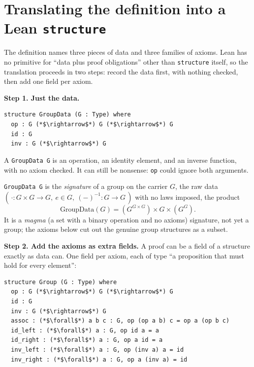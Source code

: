 \section{\texorpdfstring{Translating the definition into a Lean \texttt{structure}}{Translating the definition into a Lean structure}}\label{sec:07-groups:02-translating:1}

The definition names three pieces of data and three families of axioms. Lean has no primitive for ``data plus proof obligations'' other than \texttt{structure} itself, so the translation proceeds in two steps: record the data first, with nothing checked, then add one field per axiom.

\textbf{Step 1. Just the data.}

\begin{lstlisting}
structure GroupData (G : Type) where
  op : G (*$\rightarrow$*) G (*$\rightarrow$*) G
  id : G
  inv : G (*$\rightarrow$*) G
\end{lstlisting}

A \texttt{GroupData G} is an operation, an identity element, and an inverse function, with no axiom checked. It can still be nonsense: \texttt{op} could ignore both arguments.

\begin{mathreading}

\texttt{GroupData G} is the \emph{signature} of a group on the carrier \(G\), the raw data \((\,\cdot : G\times G \to G,\ e \in G,\
(-)^{-1} : G \to G\,)\) with no laws imposed, the product \[
\mathrm{GroupData}(G) = (G^{G\times G}) \times G \times (G^{G}).
\] It is a \emph{magma} (a set with a binary operation and no axioms) signature, not yet a group; the axioms below cut out the genuine group structures as a subset.

\end{mathreading}

\textbf{Step 2. Add the axioms as extra fields.} A proof can be a field of a structure exactly as data can. One field per axiom, each of type ``a proposition that must hold for every element'':

\begin{lstlisting}
structure Group (G : Type) where
  op : G (*$\rightarrow$*) G (*$\rightarrow$*) G
  id : G
  inv : G (*$\rightarrow$*) G
  assoc : (*$\forall$*) a b c : G, op (op a b) c = op a (op b c)
  id_left : (*$\forall$*) a : G, op id a = a
  id_right : (*$\forall$*) a : G, op a id = a
  inv_left : (*$\forall$*) a : G, op (inv a) a = id
  inv_right : (*$\forall$*) a : G, op a (inv a) = id
\end{lstlisting}

